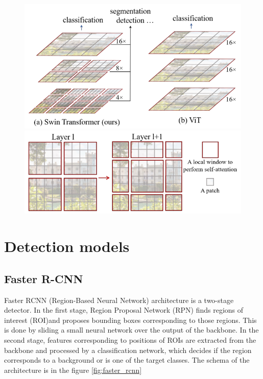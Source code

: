 \begin{figure}
    \begin{floatrow}[2]
        {\includegraphics[width=\linewidth]{images/swint_transformer_hierarchy.png}}\qquad
        {\includegraphics[width=\linewidth]{images/swint_transformer_patches.png}}
    \end{floatrow}
\end{figure}

\section{Detection models}
\label{sec:deteciton_models}

\subsection{Faster R-CNN}
Faster RCNN (Region-Based Neural Network) architecture is a two-stage detector. In the first stage, Region Proposal Network (RPN) finds regions of interest (ROI)and proposes bounding boxes corresponding to those regions. This is done by sliding a small neural network over the output of the backbone. In the second stage, features corresponding to positions of ROIs are extracted from the backbone and processed by a classification network, which decides if the region corresponds to a background or is one of the target classes. The schema of the architecture is in the figure \ref{fig:faster_rcnn}

